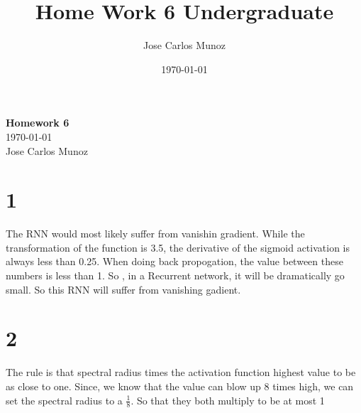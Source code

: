 \documentclass[12pt,english]{article}
\title{Home Work 6 Undergraduate}
\date{\today}
\author{Jose Carlos Munoz}
\begin{document}
\begin{center}
    \Large
    \textbf{Homework 6}\\
    \small
    \today\\
    \large
    Jose Carlos Munoz
\end{center}
\section*{1}
The RNN would most likely suffer from vanishin gradient. While the transformation of the function is 3.5, the derivative of the sigmoid activation is always less than 0.25. When doing back propogation, the value between these numbers is less than 1. So , in a Recurrent network, it will be dramatically go small. So this RNN will suffer from vanishing gadient.
\section*{2}
The rule is that spectral radius times the activation function highest value to be as close to one. Since, we know that the value can blow up 8 times high, we can set the spectral radius to a $\frac{1}{8}$. So that they both multiply to be at most 1
\end{document}
